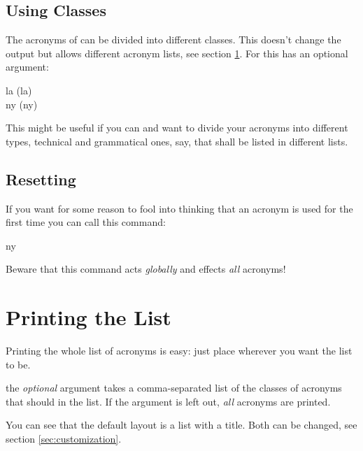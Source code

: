 \documentclass[DIV10,toc=index,toc=bib]{cnpkgdoc}
\begin{document}
\subsection{Using Classes}
The acronyms of \acro can be divided into different classes. This doesn't change
the output but allows different acronym lists, see section \ref{sec:print_lists}.
For this  has an optional argument:
\begin{beschreibung}
\end{beschreibung}
\begin{beispiel}
 \acl{la} (\acs{la}) \\
 \acl{ny} (\acs{ny})
\end{beispiel}
This might be useful if you can and want to divide your acronyms into different
types, technical and grammatical ones, say, that shall be listed in different
lists.

\subsection{Resetting}
If you want for some reason to fool \acro into thinking that an acronym is used
for the first time you can call this command:
\begin{beschreibung}
\end{beschreibung}
\begin{beispiel}
 \acreset
 \ac{ny}
\end{beispiel}
Beware that this command acts \emph{globally} and effects \emph{all} acronyms!

\section{Printing the List}\label{sec:print_lists}
Printing the whole list of acronyms is easy: just place 
wherever you want the list to be.
\begin{beschreibung}
  the \emph{optional} argument takes a
 comma-separated list of the classes of acronyms that should in the list. If the
 argument is left out, \emph{all} acronyms are printed.
\end{beschreibung}
\begin{beispiel}[below]
 \printacronyms
\end{beispiel}
You can see that the default layout is a  list with a
 title. Both can be changed, see section \ref{sec:customization}.
\end{document}
